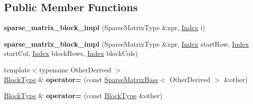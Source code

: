 \subsection*{Public Member Functions}
\begin{DoxyCompactItemize}
\item 
\mbox{\label{class_eigen_1_1internal_1_1sparse__matrix__block__impl_a774cbba24725f7aff7dd861ea497726e}} 
{\bfseries sparse\+\_\+matrix\+\_\+block\+\_\+impl} (Sparse\+Matrix\+Type \&xpr, \mbox{\hyperlink{struct_eigen_1_1_eigen_base_a554f30542cc2316add4b1ea0a492ff02}{Index}} i)
\item 
\mbox{\label{class_eigen_1_1internal_1_1sparse__matrix__block__impl_af1e7119b5d54afe75bf374e2e5600e32}} 
{\bfseries sparse\+\_\+matrix\+\_\+block\+\_\+impl} (Sparse\+Matrix\+Type \&xpr, \mbox{\hyperlink{struct_eigen_1_1_eigen_base_a554f30542cc2316add4b1ea0a492ff02}{Index}} start\+Row, \mbox{\hyperlink{struct_eigen_1_1_eigen_base_a554f30542cc2316add4b1ea0a492ff02}{Index}} start\+Col, \mbox{\hyperlink{struct_eigen_1_1_eigen_base_a554f30542cc2316add4b1ea0a492ff02}{Index}} block\+Rows, \mbox{\hyperlink{struct_eigen_1_1_eigen_base_a554f30542cc2316add4b1ea0a492ff02}{Index}} block\+Cols)
\item 
\mbox{\label{class_eigen_1_1internal_1_1sparse__matrix__block__impl_a1163a9d4638cbd5f950d413805842374}} 
{\footnotesize template$<$typename Other\+Derived $>$ }\\\mbox{\hyperlink{class_eigen_1_1_block}{Block\+Type}} \& {\bfseries operator=} (const \mbox{\hyperlink{class_eigen_1_1_sparse_matrix_base}{Sparse\+Matrix\+Base}}$<$ Other\+Derived $>$ \&other)
\item 
\mbox{\label{class_eigen_1_1internal_1_1sparse__matrix__block__impl_aae730b7511c6b56fad9cc6a118b43f35}} 
\mbox{\hyperlink{class_eigen_1_1_block}{Block\+Type}} \& {\bfseries operator=} (const \mbox{\hyperlink{class_eigen_1_1_block}{Block\+Type}} \&other)
\item 
\mbox{\label{class_eigen_1_1internal_1_1sparse__matrix__block__impl_abadc00922ce8ee648673eb7d11149d59}} 

\end{DoxyCompactItemize}
